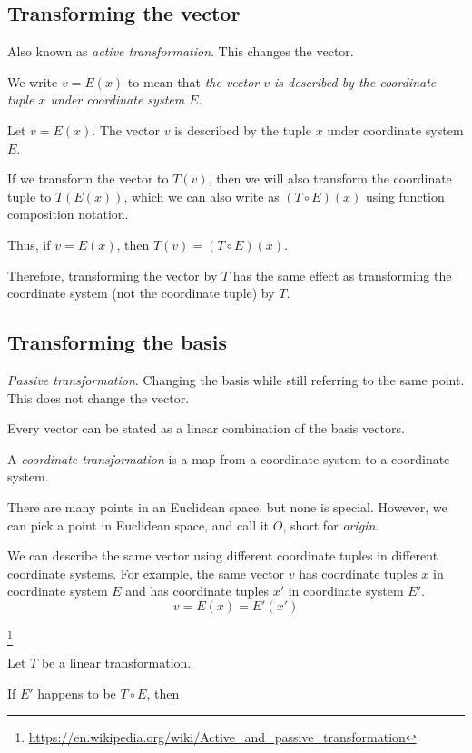 \subsection{Transforming the vector}

Also known as \emph{active transformation}.
This changes the vector.

We write \(v = E(x)\) to mean that \emph{the vector \(v\) is described by the coordinate tuple \(x\) under coordinate system \(E\)}.

Let \(v = E(x)\).
The vector \(v\) is described by the tuple \(x\) under coordinate system \(E\).

If we transform the vector to \(T(v)\),
then we will also transform the coordinate tuple to \(T(E(x))\),
which we can also write as \((T \circ E)(x)\) using function composition notation.

Thus, if \(v = E(x)\), then \( T(v) = (T \circ E)(x) \).

Therefore, transforming the vector by \(T\) has the same effect as
transforming the coordinate system (not the coordinate tuple) by \(T\).

\subsection{Transforming the basis}

\emph{Passive transformation}.
Changing the basis while still referring to the same point.
This does not change the vector.

Every vector can be stated as a linear combination of the basis vectors.

%
A \emph{coordinate transformation} is a map from a coordinate system to a coordinate system.

There are many points in an Euclidean space, but none is special.
However, we can pick a point in Euclidean space, and call it \( O \), short for \emph{origin}.

We can describe the same vector using different coordinate tuples in different coordinate systems.
For example, the same vector \(v\) has coordinate tuples \(x\) in coordinate system \(E\)
and has coordinate tuples \(x'\) in coordinate system \(E'\).
\[
    v = E(x) = E'(x')
\]

\footnote{\url{https://en.wikipedia.org/wiki/Active_and_passive_transformation}}

Let \(T\) be a linear transformation.

If \(E'\) happens to be \(T \circ E\), then

